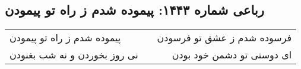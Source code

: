 \begin{center}
\section*{رباعی شماره ۱۴۴۳: پیموده شدم ز راه تو پیمودن}
\label{sec:1443}
\begin{longtable}{l p{0.5cm} r}
پیموده شدم ز راه تو پیمودن
&&
فرسوده شدم ز عشق تو فرسودن
\\
نی روز بخوردن و نه شب بغنودن
&&
ای دوستی تو دشمن خود بودن
\\
\end{longtable}
\end{center}

